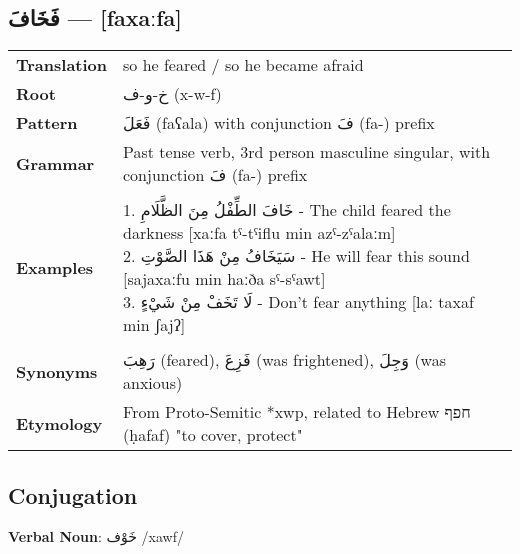 \documentclass[letterpaper,12pt]{article}
\begin{document}
\subsection{\textarabic{فَخَافَ} — [faxaːfa]}
\begin{tabular}{p{3cm}p{10cm}}
\toprule
\textbf{Translation} & so he feared / so he became afraid \\
\textbf{Root} & \textarabic{خ-و-ف} (x-w-f) \\
\textbf{Pattern} & \textarabic{فَعَلَ} (faʕala) with conjunction \textarabic{فَ} (fa-) prefix \\
\textbf{Grammar} & Past tense verb, 3rd person masculine singular, with conjunction \textarabic{فَ} (fa-) prefix \\
\midrule \\
\textbf{Examples} & \makecell[l]{\parbox{9.5cm}{
1. \textarabic{خَافَ الطِّفْلُ مِنَ الظَّلَامِ} - The child feared the darkness [xaːfa tˤ-tˤiflu min azˤ-zˤalaːm]\\
2. \textarabic{سَيَخَافُ مِنْ هَذَا الصَّوْتِ} - He will fear this sound [sajaxaːfu min haːða sˤ-sˤawt]\\
3. \textarabic{لَا تَخَفْ مِنْ شَيْءٍ} - Don't fear anything [laː taxaf min ʃajʔ]
}} \\
\midrule \\
\textbf{Synonyms} & \textarabic{رَهِبَ} (feared), \textarabic{فَزِعَ} (was frightened), \textarabic{وَجِلَ} (was anxious) \\
\textbf{Etymology} & From Proto-Semitic *xwp, related to Hebrew \texthebrew{חפף} (ḥafaf) "to cover, protect" \\
\bottomrule
\end{tabular}

\subsection{Conjugation}
\par{\large \textbf{Verbal Noun}: \textarabic{خَوْف} /xawf/}
\end{document}
